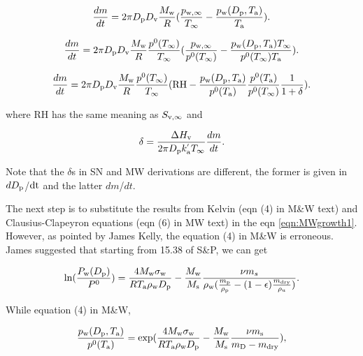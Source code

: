 \documentclass[12pt]{article}
\begin{document}
\begin{equation}\label{eqn:19}
\frac{dm}{dt}=2 \pi D_{\rm p} D_{\rm v} \frac{M_{\rm w}}{R} (\frac{p_{\rm w, \infty}}{T_{\infty}} - \frac{p_{\rm w}(D_{\rm p}, T_{\rm a})}{T_{\rm a}}).
\end{equation}


\begin{equation}\label{eqn:20}
\frac{dm}{dt}=2 \pi D_{\rm p} D_{\rm v} \frac{M_{\rm w}}{R}  \frac{p^{\rm 0}(T_{\infty})} {T_{\infty}} (\frac{p_{\rm w, \infty}}{p^{\rm 0}(T_{\infty})} - \frac{p_{\rm w}(D_{\rm p}, T_{\rm a}) T_{\infty}}{p^{\rm 0}(T_{\infty}) T_{\rm a}}).
\end{equation}


\begin{equation}\label{eqn:MWgrowth1}
\frac{dm}{dt}=2 \pi D_{\rm p} D_{\rm v}  \frac{M_{\rm w}}{R} \frac{p^{\rm 0}(T_{\infty})} {T_{\infty}} (\textrm{RH} - \frac{p_{\rm w}(D_{\rm p}, T_{\rm a})}{p^{\rm 0}(T_{\rm a})} \frac{p^{\rm 0}(T_{\rm a})}{p^{\rm 0}(T_{\infty})}\frac{1}{1+\delta}).
\end{equation}

where RH has the same meaning as $S_{\rm v, \infty}$ and 


\begin{equation}
\delta=\frac{\Delta H_{\rm v}}{2 \pi D_{\rm p} k^{'}_{\rm a} T_{\infty}} \frac{dm}{dt}.
\end{equation}

Note that the $\delta$s in SN and MW derivations are different, the former is given in $dD_{\rm p}$/$\rm dt$ and the latter $dm$/$dt$.

The next step is to substitute the results from Kelvin (eqn (4) in M\&W text) and Clausius-Clapeyron equations (eqn (6) in MW text) in the eqn \ref{eqn:MWgrowth1}. However, as pointed by James Kelly, the equation (4) in M\&W is erroneous. James suggested that starting from 15.38 of S\&P, we can get 

\begin{equation} 
\ln(\frac{P_{\rm w}(D_{\rm p})}{P^{\rm 0}})=\frac{4 M_{\rm w} \sigma_{\rm w}}{R T_{\rm a} \rho_{\rm w}D_{\rm p}}-\frac{M_{\rm w}}{M_{\rm s}}\frac{\nu m_{s}}{\rho_{\rm w}(\frac{m_{\rm p}}{\rho_{\rm p}}-(1-\epsilon)\frac{m_{\rm dry}}{\rho_{\rm u}})}.
\end{equation}

While equation (4) in M\&W, 

\begin{equation}
\frac{p_{\rm w}(D_{\rm p}, T_{\rm a})}{p^{\rm 0}(T_{\rm a})}=\exp(\frac{4 M_{\rm w} \sigma_{\rm w}}{R T_{\rm a} \rho_{\rm w} D_{\rm p}}-\frac{M_{\rm w}}{M_{\rm s}}\frac{\nu m_{\rm s}}{m_{\rm D}-m_{\rm dry}}),
\end{equation}
\end{document}
